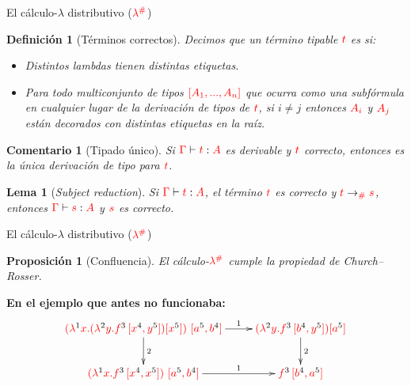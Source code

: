 \documentclass{beamer}
\newtheorem{defes}{Definición}
\newtheorem{lemes}{Lema}
\newtheorem{proes}{Proposición}
\newtheorem{comes}{Comentario}
\newcommand{\cDist}[1]{{\color{red} #1}}
\newcommand{\clambdadist}{\cDist{\lambdadist}}
\newcommand{\cLab}[1]{{\color{black} #1}}
\begin{document}
\begin{frame}{El cálculo-$\lambda$ distributivo ($\clambdadist$)}
\begin{defes}[Términos correctos]
Decimos que un término tipable $\cDist{t}$ es  si:
\begin{itemize}
\item Distintos lambdas tienen distintas etiquetas.
\item Para todo multiconjunto de tipos $\cDist{[A_1, ..., A_n]}$ que ocurra como una subfórmula
en cualquier lugar de la derivación de tipos de $\cDist{t}$, si $i\neq j$ entonces
$\cDist{A_i}$ y $\cDist{A_j}$ están decorados con distintas etiquetas en la raíz.
\end{itemize}
\end{defes}

\begin{comes}[Tipado único]
Si $\cDist{\tctx} \vdash \cDist{t} : \cDist{A}$ es derivable y $\cDist{t}$ correcto,
entonces es la única derivación de tipo para $\cDist{t}$.
\end{comes}

\begin{lemes}[\emph{Subject reduction}]
Si $\cDist{\tctx} \vdash \cDist{t} : \cDist{A}$, el término $\cDist{t}$
es correcto y $\cDist{t} \to_{\cDist{\dist}} \cDist{s}$,
entonces $\cDist{\tctx} \vdash \cDist{s} : \cDist{A}$ y $\cDist{s}$ es correcto.
\end{lemes}
\end{frame}


\begin{frame}{El cálculo-$\lambda$ distributivo ($\clambdadist$)}
\begin{proes}[Confluencia]
El cálculo-$\clambdadist$ cumple la propiedad de Church--Rosser.
\end{proes}

\vskip 1cm
\textbf{En el ejemplo que antes no funcionaba:}
\[
\xymatrix{
  \cDist{(\lamp{\cLab1}{x}{(\lamp{\cLab2}{y}{f^{\cLab3}\,[x^{\cLab4}, y^{\cLab5}]}) [x^{\cLab5}]})\ [a^{\cLab5}, b^{\cLab4}]} \ar^-{2}[d] \ar^-{1}[r] & \cDist{(\lamp{\cLab2}{y}{f^{\cLab3}\,[b^{\cLab4}, y^{\cLab5}]}) [a^{\cLab5}]} \ar^-{2}[d] \\
  \cDist{(\lamp{\cLab1}{x}{f^{\cLab3}\,[x^{\cLab4}, x^{\cLab5}]})\ [a^{\cLab5}, b^{\cLab4}]} \ar^-{1}[r] & \cDist{f^{\cLab3}\,[b^{\cLab4}, a^{\cLab5}]}\\
}
\]
\end{frame}
\end{document}
